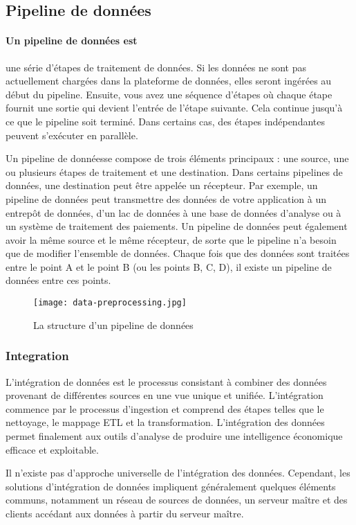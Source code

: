     \subsection{Pipeline de données}\label{data_pipeline}
    \paragraph*{Un pipeline de données est} une série d'étapes de traitement de données. Si les données ne sont pas actuellement chargées dans la plateforme de données, elles seront ingérées au début du pipeline. Ensuite, vous avez une séquence d'étapes où chaque étape fournit une sortie qui devient l'entrée de l'étape suivante. Cela continue jusqu'à ce que le pipeline soit terminé. Dans certains cas, des étapes indépendantes peuvent s'exécuter en parallèle.  
    
    Un pipeline de donnéesse compose de trois éléments principaux : une source, une ou plusieurs étapes de traitement et une destination. Dans certains pipelines de données, une destination peut être appelée un récepteur. Par exemple, un pipeline de données peut transmettre des données de votre application à un entrepôt de données, d'un lac de données à une base de données d'analyse ou à un système de traitement des paiements. Un pipeline de données peut également avoir la même source et le même récepteur, de sorte que le pipeline n'a besoin que de modifier l'ensemble de données. Chaque fois que des données sont traitées entre le point A et le point B (ou les points B, C, D), il existe un pipeline de données entre ces points.
    \begin{figure}[H]
        \centering
        \texttt{[image: data-preprocessing.jpg]}
        \caption{La structure d'un pipeline de données}\label{fig:data_preprocessing}
    \end{figure}
        \subsubsection{Integration}
        L'intégration de données est le processus consistant à combiner des données provenant de différentes sources en une vue unique et unifiée. L'intégration commence par le processus d'ingestion et comprend des étapes telles que le nettoyage, le mappage ETL et la transformation. L'intégration des données permet finalement aux outils d'analyse de produire une intelligence économique efficace et exploitable.

        Il n'existe pas d'approche universelle de l'intégration des données. Cependant, les solutions d'intégration de données impliquent généralement quelques éléments communs, notamment un réseau de sources de données, un serveur maître et des clients accédant aux données à partir du serveur maître.

